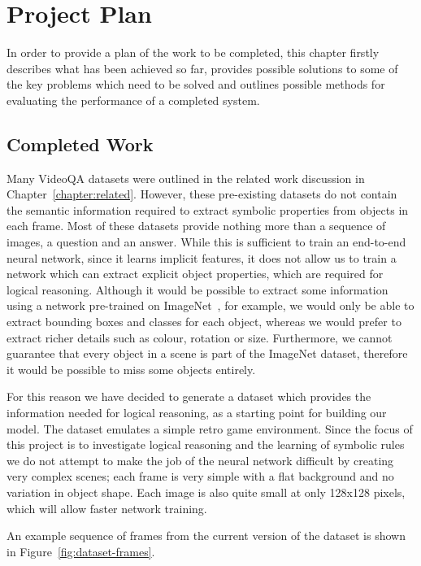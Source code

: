 \documentclass[../interim.tex]{subfiles}
\begin{document}
\chapter{Project Plan}

In order to provide a plan of the work to be completed, this chapter firstly describes what has been achieved so far, provides possible solutions to some of the key problems which need to be solved and outlines possible methods for evaluating the performance of a completed system.

\section{Completed Work}

Many VideoQA datasets were outlined in the related work discussion in Chapter~\ref{chapter:related}. However, these pre-existing datasets do not contain the semantic information required to extract symbolic properties from objects in each frame. Most of these datasets provide nothing more than a sequence of images, a question and an answer. While this is sufficient to train an end-to-end neural network, since it learns implicit features, it does not allow us to train a network which can extract explicit object properties, which are required for logical reasoning. Although it would be possible to extract some information using a network pre-trained on ImageNet~\cite{imagenet}, for example, we would only be able to extract bounding boxes and classes for each object, whereas we would prefer to extract richer details such as colour, rotation or size. Furthermore, we cannot guarantee that every object in a scene is part of the ImageNet dataset, therefore it would be possible to miss some objects entirely.

For this reason we have decided to generate a dataset which provides the information needed for logical reasoning, as a starting point for building our model. The dataset emulates a simple retro game environment. Since the focus of this project is to investigate logical reasoning and the learning of symbolic rules we do not attempt to make the job of the neural network difficult by creating very complex scenes; each frame is very simple with a flat background and no variation in object shape. Each image is also quite small at only 128x128 pixels, which will allow faster network training.

An example sequence of frames from the current version of the dataset is shown in Figure~\ref{fig:dataset-frames}.
\end{document}

